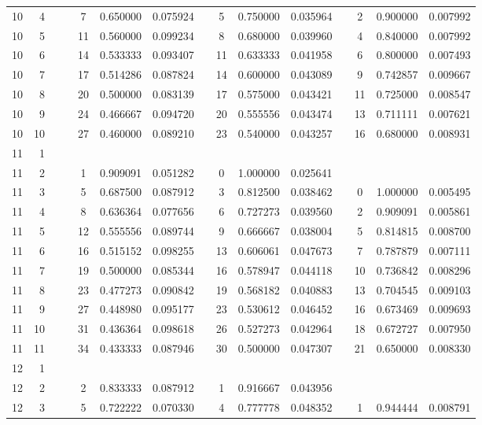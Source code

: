 \begin{appendix}
\begin{longtable}[h]{rrrcccccccccccc}
10	&	4	&&&	7	&	0.650000	&	0.075924	&&	5	&	0.750000	&	0.035964	&&	2	&	0.900000	&	0.007992	\\
10	&	5	&&&	11	&	0.560000	&	0.099234	&&	8	&	0.680000	&	0.039960	&&	4	&	0.840000	&	0.007992	\\
10	&	6	&&&	14	&	0.533333	&	0.093407	&&	11	&	0.633333	&	0.041958	&&	6	&	0.800000	&	0.007493	\\
10	&	7	&&&	17	&	0.514286	&	0.087824	&&	14	&	0.600000	&	0.043089	&&	9	&	0.742857	&	0.009667	\\
10	&	8	&&&	20	&	0.500000	&	0.083139	&&	17	&	0.575000	&	0.043421	&&	11	&	0.725000	&	0.008547	\\
10	&	9	&&&	24	&	0.466667	&	0.094720	&&	20	&	0.555556	&	0.043474	&&	13	&	0.711111	&	0.007621	\\
10	&	10	&&&	27	&	0.460000	&	0.089210	&&	23	&	0.540000	&	0.043257	&&	16	&	0.680000	&	0.008931	\\
11	&	1	&&&		&		&		&&		&		&		&&		&		&		\\
11	&	2	&&&	1	&	0.909091	&	0.051282	&&	0	&	1.000000	&	0.025641	&&		&		&		\\
11	&	3	&&&	5	&	0.687500	&	0.087912	&&	3	&	0.812500	&	0.038462	&&	0	&	1.000000	&	0.005495	\\
11	&	4	&&&	8	&	0.636364	&	0.077656	&&	6	&	0.727273	&	0.039560	&&	2	&	0.909091	&	0.005861	\\
11	&	5	&&&	12	&	0.555556	&	0.089744	&&	9	&	0.666667	&	0.038004	&&	5	&	0.814815	&	0.008700	\\
11	&	6	&&&	16	&	0.515152	&	0.098255	&&	13	&	0.606061	&	0.047673	&&	7	&	0.787879	&	0.007111	\\
11	&	7	&&&	19	&	0.500000	&	0.085344	&&	16	&	0.578947	&	0.044118	&&	10	&	0.736842	&	0.008296	\\
11	&	8	&&&	23	&	0.477273	&	0.090842	&&	19	&	0.568182	&	0.040883	&&	13	&	0.704545	&	0.009103	\\
11	&	9	&&&	27	&	0.448980	&	0.095177	&&	23	&	0.530612	&	0.046452	&&	16	&	0.673469	&	0.009693	\\
11	&	10	&&&	31	&	0.436364	&	0.098618	&&	26	&	0.527273	&	0.042964	&&	18	&	0.672727	&	0.007950	\\
11	&	11	&&&	34	&	0.433333	&	0.087946	&&	30	&	0.500000	&	0.047307	&&	21	&	0.650000	&	0.008330	\\
12	&	1	&&&		&		&		&&		&		&		&&		&		&		\\
12	&	2	&&&	2	&	0.833333	&	0.087912	&&	1	&	0.916667	&	0.043956	&&		&		&		\\
12	&	3	&&&	5	&	0.722222	&	0.070330	&&	4	&	0.777778	&	0.048352	&&	1	&	0.944444	&	0.008791	\\

\end{longtable}
\end{appendix}
